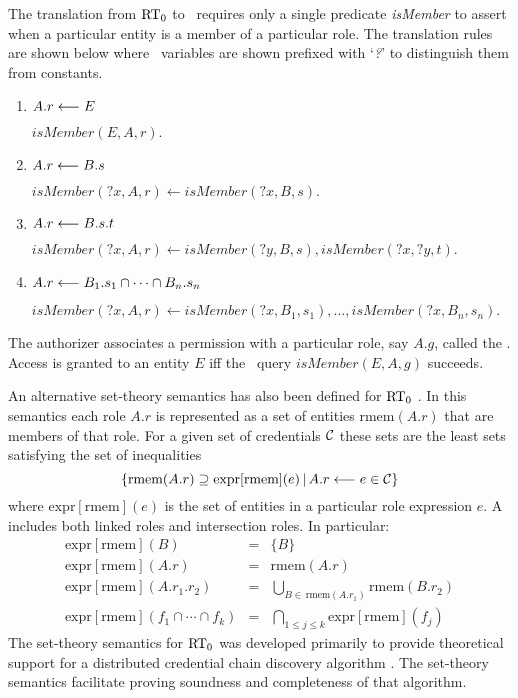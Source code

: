 The translation from $\text{RT}_0$ to \datalog\ requires only a single
predicate \textit{isMember} to assert when a particular entity is a member
of a particular role. The translation rules are shown below where \datalog\
variables are shown prefixed with `\textit{?}' to distinguish them from
constants.
\begin{enumerate}

\item $A.r \stackrel{}{\longleftarrow} E$

$\textit{isMember}(E, A, r).$

\item $A.r \stackrel{}{\longleftarrow} B.s$

$\textit{isMember}(\textit{?x}, A, r) \leftarrow
 \textit{isMember}(\textit{?x}, B, s).$

\item $A.r \stackrel{}{\longleftarrow} B.s.t$

$\textit{isMember}(\textit{?x}, A, r) \leftarrow
 \textit{isMember}(\textit{?y}, B, s),
 \textit{isMember}(\textit{?x}, \textit{?y}, t).$

\item $A.r \stackrel{}{\longleftarrow} B_1.s_1 \cap \cdots \cap B_n.s_n$

$\textit{isMember}(\textit{?x}, A, r) \leftarrow
 \textit{isMember}(\textit{?x}, B_1, s_1), \ldots,
 \textit{isMember}(\textit{?x}, B_n, s_n).$

\end{enumerate}
The authorizer associates a permission with a particular role, say $A.g$,
called the \newterm{governing role}. Access is granted to an entity $E$ iff
the \datalog\ query $\textit{isMember}(E, A, g)$ succeeds.

An alternative set-theory semantics has also been defined for $\text{RT}_0$
\cite{Li:DCDTM}. In this semantics each role $A.r$ is represented as a set
of entities $\mbox{rmem}(A.r)$ that are members of that role. For a given
set of credentials $\mathcal{C}$ these sets are the least sets satisfying the
set of inequalities
\begin{displaymath}
\{ \mbox{rmem}(A.r) \supseteq \mbox{expr}[\mbox{rmem}](e)\,|\,
   A.r \longleftarrow e \in \mathcal{C} \}
\end{displaymath}
where $\mbox{expr}[\mbox{rmem}](e)$ is the set of entities in a
particular role expression $e$. A  includes
both linked roles and intersection roles. In particular:
\begin{eqnarray*}
\mbox{expr}[\mbox{rmem}](B) & = & \{B\} \\
\mbox{expr}[\mbox{rmem}](A.r) & = & \mbox{rmem}(A.r) \\
\mbox{expr}[\mbox{rmem}](A.r_1.r_2) & = &
  \bigcup_{B \in\, \mbox{rmem}(A.r_1)} \mbox{rmem}(B.r_2) \\
\mbox{expr}[\mbox{rmem}](f_1 \cap \cdots \cap f_k) & = &
  \bigcap_{1 \le j \le k} \mbox{expr}[\mbox{rmem}](f_j)
\end{eqnarray*}
The set-theory semantics for $\text{RT}_0$ was developed primarily to provide
theoretical support for a distributed credential chain discovery algorithm
\cite{Li:DCDTM}. The set-theory semantics facilitate proving soundness and
completeness of that algorithm.

